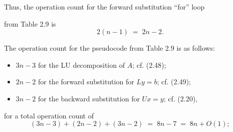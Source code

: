 Thus, the operation count for the forward substitution ``for'' loop

\begin{center}
\end{center}

from Table 2.9 is
\begin{equation}
2(n-1) \;=\; 2n-2.
\end{equation}

The operation count for the pseudocode from Table 2.9 is as follows:
\begin{itemize}
\item $3n-3$ for the LU decomposition of $A$; cf. (2.48);
\item $2n-2$ for the forward substitution for $Ly=b$; cf. (2.49);
\item $3n-2$ for the backward substitution for $Ux=y$; cf. (2.20),
\end{itemize}
for a total operation count of
\[
(3n-3) + (2n-2) + (3n-2) \;=\; 8n-7 \;=\; 8n+O(1);
\]
